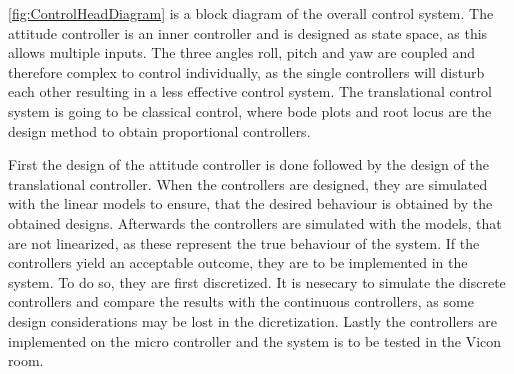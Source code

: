 \autoref{fig:ControlHeadDiagram} is a block diagram of the overall control system.
The attitude controller is an inner controller and is designed as state space, as this allows multiple inputs. The three angles roll, pitch and yaw are coupled and therefore complex to control individually, as the single controllers will disturb each other resulting in a less effective control system. The translational control system is going to be classical control, where bode plots and root locus are the design method to obtain proportional controllers. 

First the design of the attitude controller is done followed by the design of the translational controller. 
When the controllers are designed, they are simulated with the linear models to ensure, that the desired behaviour is obtained by the obtained designs. Afterwards the controllers are simulated with the models, that are not linearized, as these represent the true behaviour of the system. If the controllers yield an acceptable outcome, they are to be implemented in the system. To do so, they are first discretized. It is nesecary to simulate the discrete controllers and compare the results with the continuous controllers, as some design considerations may be lost in the dicretization. Lastly the controllers are implemented on the micro controller and the system is to be tested in the Vicon room. 

